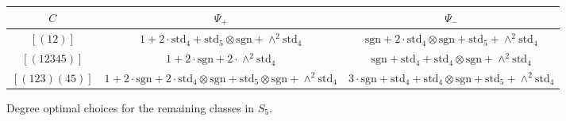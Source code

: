 \documentclass[12pt]{amsart}
\theoremstyle{definition} \newtheorem{definition}[theorem]{Definition}
\theoremstyle{example} \newtheorem{example}[theorem]{Example}
\theoremstyle{remark} \newtheorem{remark}{Remark}[theorem]
\numberwithin{equation}{section}
\numberwithin{theorem}{section}
\begin{document}
	{\tiny
	\begin{table}[h]
		\begin{tabular}{|c|c|c|} \hline
			$C$ & $\Psi_+$ & $\Psi_-$ \\ \hline \hline
				$[(12)]$ & {\tiny $1 + 2\cdot \mathrm{std}_4 + \mathrm{std}_5 \otimes \mathrm{sgn} + \wedge^2 \mathrm{std}_4$} 
				& {\tiny $\mathrm{sgn} + 2\cdot\mathrm{std}_4\otimes \mathrm{sgn} + \mathrm{std}_5 + \wedge^2 \mathrm{std}_4$} \\ \hline
				$[(12345)]$ & {\tiny $1 + 2\cdot \mathrm{sgn} + 2\cdot \wedge^2\mathrm{std}_4$} 
				& {\tiny $\mathrm{sgn} + \mathrm{std}_4 + \mathrm{std}_4\otimes \mathrm{sgn} + \wedge^2 \mathrm{std}_4$} \\ \hline
				$[(123)(45)]$ & {\tiny $1 + 2\cdot\mathrm{sgn} + 2\cdot\mathrm{std}_4\otimes \mathrm{sgn} + \mathrm{std}_5\otimes \mathrm{sgn} + \wedge^2 \mathrm{std}_4$} 
				& {\tiny $3\cdot \mathrm{sgn} + \mathrm{std}_4 + \mathrm{std}_4 \otimes \mathrm{sgn} + \mathrm{std}_5 + \wedge^2 \mathrm{std}_4$} \\ \hline
		\end{tabular}
		\begin{caption}{\label{tbl:basepoints-5} Degree optimal choices for the remaining classes in $S_5$.}
		\end{caption}
	\end{table}}
	
\end{document}

